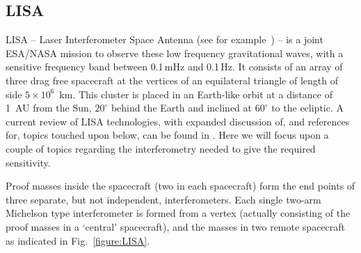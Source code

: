 \documentclass{article}
\begin{document}
\subsection{LISA}
LISA -- Laser Interferometer Space Antenna (see for example~\cite{LISAsymposium,
NASAweb, ESAweb}) -- is a joint ESA/NASA mission to observe these low frequency
gravitational waves, with a sensitive frequency band between 0.1\,mHz and
0.1\,Hz. It consists of an array of three drag free spacecraft at the vertices
of an equilateral triangle of length of side $5 \times 10^6$~km. This cluster 
is placed in an Earth-like orbit at a distance of 1~AU from the Sun,
$20^{\circ}$ behind the Earth and inclined at $60^{\circ}$ to the ecliptic. A
current review of LISA technologies, with expanded discussion of, and references
for, topics touched upon below, can be found in \cite{Jennrich:2009}. Here we
will focus upon a couple of topics regarding the interferometry needed to give
the required sensitivity.

Proof masses inside the spacecraft (two in each spacecraft) form the end points
of three separate, but not independent, interferometers. Each single two-arm 
Michelson type interferometer is formed from a vertex (actually consisting of
the proof masses in a `central' spacecraft), and the masses in two remote
spacecraft as indicated in Fig.~\ref{figure:LISA}.

\end{document}
